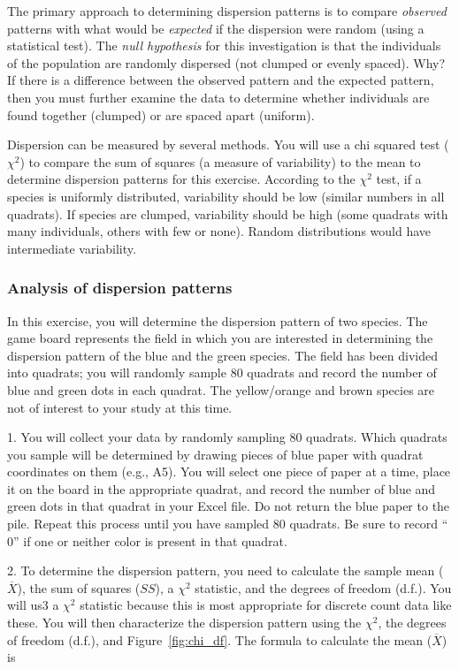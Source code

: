 \documentclass[12pt, hidelinks]{exam}
\newcommand\chisq{$\chi^2$}
\begin{document}
The primary approach to determining dispersion patterns is to compare
\emph{observed} patterns with what would be \emph{expected} if the
dispersion were random (using a statistical test). The \emph{null
hypothesis} for this investigation is that the individuals of the
population are randomly dispersed (not clumped or evenly spaced). Why?
If there is a difference between the observed pattern and the expected
pattern, then you must further examine the data to determine whether
individuals are found together (clumped) or are spaced apart (uniform).

Dispersion can be measured by several methods. You will use
a chi squared test (\kern1.1667pt\chisq{}) to compare the sum of squares
(a measure of variability) to the mean to determine dispersion patterns
for this exercise. According to the \chisq{} test, if a species is
uniformly distributed, variability should be low (similar numbers in all
quadrats). If species are clumped, variability should be high (some
quadrats with many individuals, others with few or none). Random
distributions would have intermediate variability.

\subsubsection*{Analysis of dispersion patterns}

In this exercise, you will determine the dispersion pattern of two
species. The game board represents the field in which you are interested
in determining the dispersion pattern of the blue and the green species.
The field has been divided into quadrats; you will randomly sample 80
quadrats and record the number of blue and green dots in each quadrat.
The yellow/orange and brown species are not of interest to your study at
this time.

1. You will collect your data by randomly sampling 80 quadrats. Which
quadrats you sample will be determined by drawing pieces of blue paper
with quadrat coordinates on them (e.g., A5). You will select one piece of
paper at a time, place it on the board in the appropriate quadrat, and
record the number of blue and green dots in that quadrat in your Excel
file. Do not return the blue paper to the pile. Repeat this process
until you have sampled 80 quadrats. Be sure to record ``$0$'' if one or
neither color is present in that quadrat.

2. To determine the dispersion pattern, you need to calculate the sample
mean ($\overline{X}$), the sum of squares ($SS$), a \chisq{} statistic, and the
degrees of freedom (d.f.). You will us3 a \chisq{} statistic
because this is most appropriate for discrete count data like these.
 You will then characterize the dispersion pattern using the
\chisq{}, the degrees of freedom (d.f.), and Figure~\ref{fig:chi_df}. The formula 
to calculate the mean ($\overline{X}$) is
\end{document}
